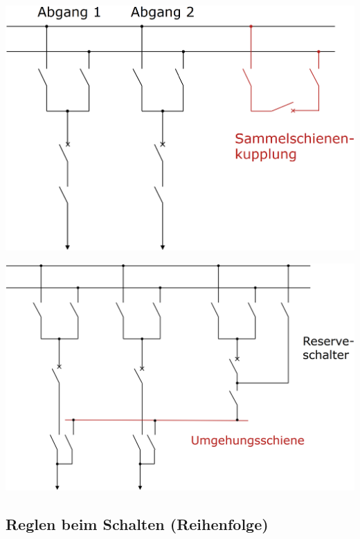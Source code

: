 \begin{minipage}[c]{0.48\columnwidth}
    \begin{center}
        \includegraphics[width=0.98\columnwidth]{images/Sammelscheinenkupplung.png}
    \end{center}
\end{minipage}
\hfill
\begin{minipage}[c]{0.48\columnwidth}
    \begin{center}
        \includegraphics[width=0.98\columnwidth]{images/Umgehungsschiene.png}
    \end{center}
\end{minipage}

\subsection{Reglen beim Schalten (Reihenfolge)}

